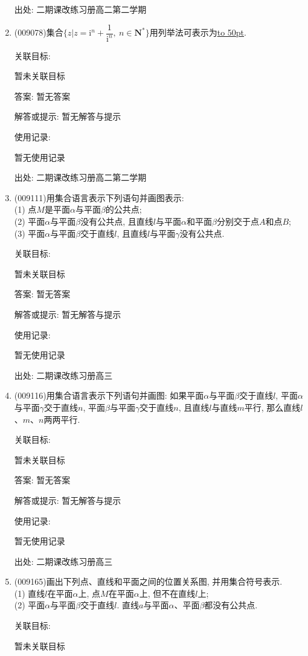 \documentclass[10pt,a4paper]{article}
\newcommand{\blank}[1]{\underline{\hbox to #1pt{}}}
\begin{document}
\begin{enumerate}[1.]
出处: 二期课改练习册高二第二学期
\item { (009078)}集合$\{z|z=\mathrm{i}^n+\dfrac 1{\mathrm{i}^n}, \ n\in \mathbf{N}^*\}$用列举法可表示为\blank{50}.


关联目标:

暂未关联目标

答案: 暂无答案

解答或提示: 暂无解答与提示

使用记录:

暂无使用记录


出处: 二期课改练习册高二第二学期
\item { (009111)}用集合语言表示下列语句并画图表示:\\
(1) 点$M$是平面$\alpha$与平面$\beta$的公共点;\\
(2) 平面$\alpha$与平面$\beta$没有公共点, 且直线$l$与平面$\alpha$和平面$\beta$分别交于点$A$和点$B$;\\
(3) 平面$\alpha$与平面$\beta$交于直线$l$, 且直线$l$与平面$\gamma$没有公共点.


关联目标:

暂未关联目标

答案: 暂无答案

解答或提示: 暂无解答与提示

使用记录:

暂无使用记录


出处: 二期课改练习册高三
\item { (009116)}用集合语言表示下列语句并画图:
如果平面$\alpha$与平面$\beta$交于直线$l$, 平面$\alpha$与平面$\gamma$交于直线$n$, 平面$\beta$与平面$\gamma$交于直线$n$, 且直线$l$与直线$m$平行, 那么直线$l$、$m$、$n$两两平行.


关联目标:

暂未关联目标

答案: 暂无答案

解答或提示: 暂无解答与提示

使用记录:

暂无使用记录


出处: 二期课改练习册高三
\item { (009165)}画出下列点、直线和平面之间的位置关系图, 并用集合符号表示.\\
(1) 直线$l$在平面$\alpha$上, 点$M$在平面$\alpha$上, 但不在直线$l$上;\\
(2) 平面$\alpha$与平面$\beta$交于直线$l$. 直线$a$与平面$\alpha$、平面$\beta$都没有公共点.


关联目标:

暂未关联目标


\end{enumerate}
\end{document}
